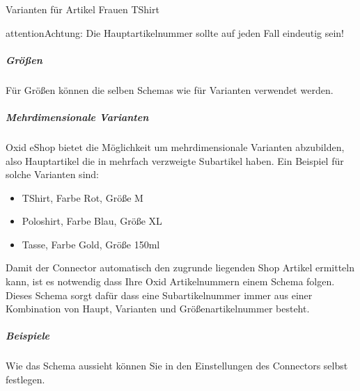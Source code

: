 \documentclass[letterpaper,10pt,ngerman]{sphinxmanual}
\begin{document}
Varianten für Artikel Frauen T\sphinxhyphen{}Shirt

\begin{sphinxVerbatim}[commandchars=\\\{\}]
 
 
 
 
\end{sphinxVerbatim}

\begin{sphinxadmonition}{attention}{Achtung:}
Die Hauptartikelnummer sollte auf jeden Fall eindeutig sein!
\end{sphinxadmonition}


\subparagraph{Größen}
\label{\detokenize{modules/general/skuscheme:groszen}}
Für Größen können die selben Schemas wie für Varianten verwendet werden.


\subparagraph{Mehrdimensionale Varianten}
\label{\detokenize{modules/general/skuscheme:mehrdimensionale-varianten}}
Oxid eShop bietet die Möglichkeit um mehrdimensionale Varianten abzubilden,
also Hauptartikel die in mehrfach verzweigte Subartikel haben.
Ein Beispiel für solche Varianten sind:
\begin{itemize}
\item {} 
T\sphinxhyphen{}Shirt, Farbe Rot, Größe M

\item {} 
Poloshirt, Farbe Blau, Größe XL

\item {} 
Tasse, Farbe Gold, Größe 150ml

\end{itemize}

Damit der Connector automatisch den zugrunde liegenden Shop Artikel ermitteln kann,
ist es notwendig dass Ihre Oxid Artikelnummern einem Schema folgen.
Dieses Schema sorgt dafür dass eine Subartikelnummer immer aus einer
Kombination von Haupt\sphinxhyphen{}, Varianten\sphinxhyphen{} und Größenartikelnummer besteht.


\subparagraph{Beispiele}
\label{\detokenize{modules/general/skuscheme:beispiele}}
Wie das Schema aussieht können Sie in den Einstellungen des Connectors selbst festlegen.

\begin{sphinxVerbatim}[commandchars=\\\{\}]
\end{sphinxVerbatim}
\end{document}
